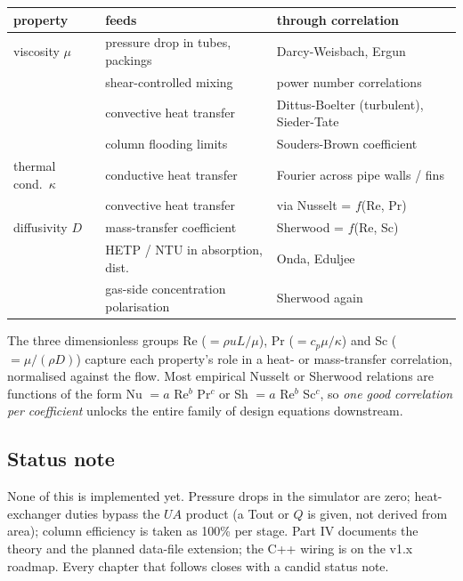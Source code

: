 \documentclass[11pt,a4paper]{article}
\begin{document}
\begin{center}\small
\begin{tabular}{@{}lll@{}}
\toprule
property & feeds & through correlation\\
\midrule
viscosity $\mu$       & pressure drop in tubes, packings    & Darcy-Weisbach, Ergun \\
                      & shear-controlled mixing             & power number correlations \\
                      & convective heat transfer            & Dittus-Boelter (turbulent), Sieder-Tate \\
                      & column flooding limits              & Souders-Brown coefficient \\[2pt]
thermal cond.\ $\kappa$ & conductive heat transfer          & Fourier across pipe walls / fins \\
                      & convective heat transfer            & via Nusselt = $f$(Re, Pr) \\[2pt]
diffusivity $D$       & mass-transfer coefficient          & Sherwood = $f$(Re, Sc) \\
                      & HETP / NTU in absorption, dist.\ & Onda, Eduljee \\
                      & gas-side concentration polarisation & Sherwood again \\
\bottomrule
\end{tabular}
\end{center}

\begin{intuition}
The three dimensionless groups Re ($= \rho u L / \mu$), Pr ($= c_p
\mu / \kappa$) and Sc ($= \mu / (\rho D)$) capture each property's
role in a heat- or mass-transfer correlation, normalised against the
flow.  Most empirical Nusselt or Sherwood relations are functions of
the form Nu $= a$ Re$^b$ Pr$^c$ or Sh $= a$ Re$^b$ Sc$^c$, so
\emph{one good correlation per coefficient} unlocks the entire family
of design equations downstream.
\end{intuition}

\subsection{Status note}

None of this is implemented yet.  Pressure drops in the simulator are
zero; heat-exchanger duties bypass the $U A$ product (a Tout or $Q$
is given, not derived from area); column efficiency is taken as 100\%
per stage.  Part IV documents the theory and the planned data-file
extension; the C++ wiring is on the v1.x roadmap.  Every chapter that
follows closes with a candid status note.
\end{document}
